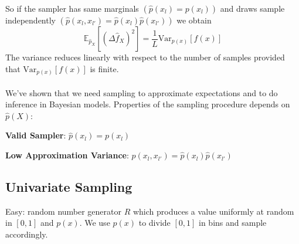 \documentclass[10pt]{report}
\begin{document}
So if the sampler has same marginals $(\hat{p}(x_l)=p(x_l))$ and draws sample independently $(\hat{p}(x_l,x_{l'}) = \hat{p}(x_l)\hat{p}(x_{l'}))$ we obtain $$\mathbb{E}_{\hat{p}_X}[(\Delta \hat{f}_X)^2] = \frac{1}{L}\text{Var}_{p(x)}[f(x)]$$
The variance reduces linearly with respect to the number of samples provided that $\text{Var}_{p(x)}[f(x)]$ is finite.\\\\
We've shown that we need sampling to approximate expectations and to do inference in Bayesian models. Properties of the sampling procedure depends on $\hat{p}(X)$:
\begin{list}{}{}
	\item \textbf{Valid Sampler}: $\hat{p}(x_l) = p(x_l)$
	\item \textbf{Low Approximation Variance}: $\hat{p}(x_l,x_{l'}) = \hat{p}(x_l)\hat{p}(x_{l'})$
\end{list}
\pagebreak
\subsection{Univariate Sampling}
Easy: random number generator $R$ which produces a value uniformly at random in $[0,1]$ and $p(x)$. We use $p(x)$ to divide $[0,1]$ in bins and sample accordingly.
\end{document}
